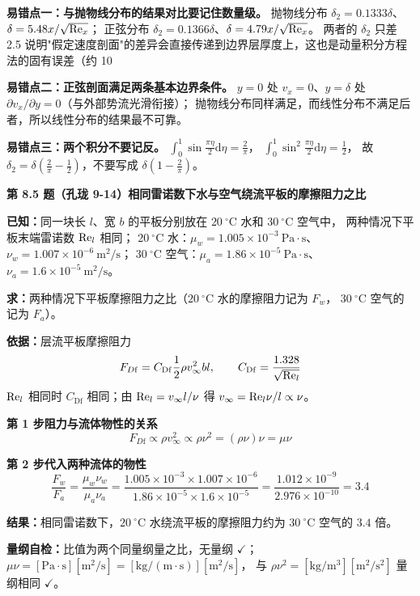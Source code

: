 \begin{yicuo}
\textbf{易错点一：与抛物线分布的结果对比要记住数量级。}
抛物线分布 $\delta_2=0.1333\delta$、$\delta=5.48x/\sqrt{\mathrm{Re}_x}$；
正弦分布 $\delta_2=0.1366\delta$、$\delta=4.79x/\sqrt{\mathrm{Re}_x}$。
两者的 $\delta_2$ 只差 2.5%
说明"假定速度剖面"的差异会直接传递到边界层厚度上，这也是动量积分方程法的固有误差（约 10%

\textbf{易错点二：正弦剖面满足两条基本边界条件。}
$y=0$ 处 $v_x=0$、$y=\delta$ 处 $\partial v_x/\partial y=0$（与外部势流光滑衔接）；
抛物线分布同样满足，而线性分布不满足后者，所以线性分布的结果最不可靠。

\textbf{易错点三：两个积分不要记反。}
$\displaystyle\int_0^{1}\sin\frac{\pi\eta}{2}\mathrm{d}\eta=\frac{2}{\pi}$，
$\displaystyle\int_0^{1}\sin^{2}\frac{\pi\eta}{2}\mathrm{d}\eta=\frac{1}{2}$，
故 $\delta_2=\delta\left(\frac{2}{\pi}-\frac{1}{2}\right)$，不要写成 $\delta\left(1-\frac{2}{\pi}\right)$。
\end{yicuo}

\noindent\textbf{第 8.5 题（孔珑 9-14）\quad 相同雷诺数下水与空气绕流平板的摩擦阻力之比}

\begin{jie}
\textbf{已知：}同一块长 $l$、宽 $b$ 的平板分别放在 $20\ ^{\circ}\mathrm{C}$ 水和 $30\ ^{\circ}\mathrm{C}$ 空气中，
两种情况下平板末端雷诺数 $\mathrm{Re}_l$ 相同；
$20\ ^{\circ}\mathrm{C}$ 水：$\mu_w=1.005\times10^{-3}\ \mathrm{Pa\cdot s}$、
$\nu_w=1.007\times10^{-6}\ \mathrm{m^2/s}$；
$30\ ^{\circ}\mathrm{C}$ 空气：$\mu_a=1.86\times10^{-5}\ \mathrm{Pa\cdot s}$、
$\nu_a=1.6\times10^{-5}\ \mathrm{m^2/s}$。

\textbf{求：}两种情况下平板摩擦阻力之比（$20\ ^{\circ}\mathrm{C}$ 水的摩擦阻力记为 $F_w$，
$30\ ^{\circ}\mathrm{C}$ 空气的记为 $F_a$）。

\textbf{依据：}层流平板摩擦阻力
\[ F_{D\mathrm{f}}=C_{\mathrm{Df}}\frac{1}{2}\rho v_\infty^{2}bl,\qquad
C_{\mathrm{Df}}=\frac{1.328}{\sqrt{\mathrm{Re}_l}} \]
$\mathrm{Re}_l$ 相同时 $C_{\mathrm{Df}}$ 相同；由 $\mathrm{Re}_l=v_\infty l/\nu$ 得 $v_\infty=\mathrm{Re}_l\nu/l\propto\nu$。

\textbf{第 1 步\quad 阻力与流体物性的关系}
\[ F_{D\mathrm{f}}\propto\rho v_\infty^{2}\propto\rho\nu^{2}=(\rho\nu)\nu=\mu\nu \]

\textbf{第 2 步\quad 代入两种流体的物性}
\[ \frac{F_w}{F_a}
=\frac{\mu_w\nu_w}{\mu_a\nu_a}
=\frac{1.005\times10^{-3}\times1.007\times10^{-6}}{1.86\times10^{-5}\times1.6\times10^{-5}}
=\frac{1.012\times10^{-9}}{2.976\times10^{-10}}=3.4 \]

\textbf{结果：}相同雷诺数下，$20\ ^{\circ}\mathrm{C}$ 水绕流平板的摩擦阻力约为
$30\ ^{\circ}\mathrm{C}$ 空气的 $\mathbf{3.4}$ 倍。

\textbf{量纲自检：}比值为两个同量纲量之比，无量纲 $\checkmark$；
$\mu\nu=[\mathrm{Pa\cdot s}][\mathrm{m^2/s}]=[\mathrm{kg/(m\cdot s)}][\mathrm{m^2/s}]$，
与 $\rho\nu^{2}=[\mathrm{kg/m^3}][\mathrm{m^2/s^2}]$ 量纲相同 $\checkmark$。
\end{jie}

